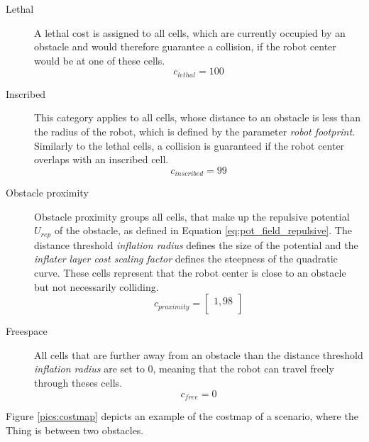 \begin{description}
  \item[Lethal] A lethal cost is assigned to all cells, which are currently occupied by an obstacle and would therefore guarantee a collision, if the robot center would be at one of these cells.
  \begin{equation}
  c_{lethal} = 100
  \end{equation}
  \item[Inscribed] This category applies to all cells, whose distance to an obstacle is less than the radius of the robot, which is defined by the parameter \emph{robot footprint}. Similarly to the lethal cells, a collision is guaranteed if the robot center overlaps with an inscribed cell.
    \begin{equation}
  c_{inscribed} = 99
  \end{equation}
  \item[Obstacle proximity] Obstacle proximity groups all cells, that make up the repulsive potential $U_{rep}$ of the obstacle, as defined in Equation \ref{eq:pot_field_repulsive}. The distance threshold \emph{inflation radius} defines the size of the potential and the \emph{inflater layer cost scaling factor} defines the steepness of the quadratic curve. These cells represent that the robot center is close to an obstacle but not necessarily colliding.
    \begin{equation}
  c_{proximity} = \begin{bmatrix}
  1,98 \\ 
  \end{bmatrix}
  \end{equation}
  \item[Freespace] All cells that are further away from an obstacle than the distance threshold \emph{inflation radius} are set to 0, meaning that the robot can travel freely through theses cells.
    \begin{equation}
  c_{free} = 0
  \end{equation}
\end{description}

Figure \ref{pics:costmap} depicts an example of the costmap of a scenario, where the Thing is between two obstacles.

